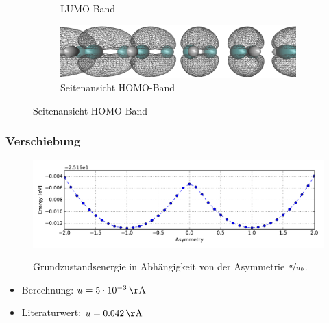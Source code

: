 \begin{frame}
\begin{figure}
\begin{subfigure}{0.4\textwidth}
\caption{LUMO-Band}
\label{image_lumo1}
\end{subfigure}
\begin{subfigure}{\textwidth}
\centering
\includegraphics[width = 10cm]{Images/polyacetylene/wavefunctions/HOMO_Side_View}
\caption{Seitenansicht HOMO-Band}
\label{image_homo1_side_view}
\end{subfigure}
\end{figure}
\end{frame}

\begin{frame}
\frametitle{Verschiebung}
\begin{figure}
\centering
\centering
\includegraphics[width = \textwidth]{Images/polyacetylene/convergence/Potential_with_asymmetry}
\label{image_potential_with_asymmetry}
\caption{Grundzustandsenergie in Abhängigkeit von der Asymmetrie $\nicefrac{u}{u_0}$.}
\end{figure}
\begin{itemize}
\item Berechnung: $u = \unit[5\cdot10^{-3}]{\AA}$
\item Literaturwert: $u = \unit[0.042]{\AA}$
\end{itemize}
\end{frame}

